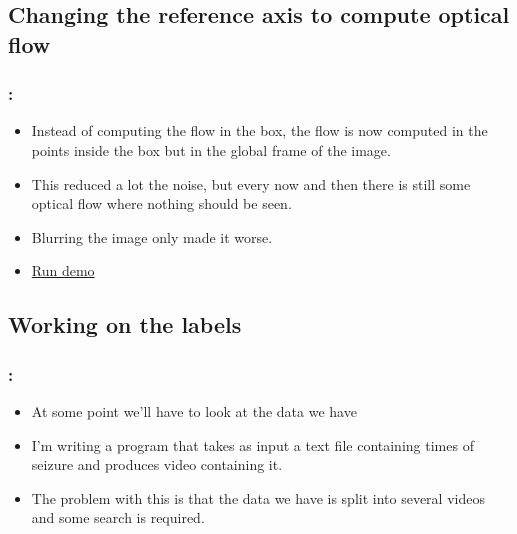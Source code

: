 \documentclass{beamer}
\begin{document}
\subsection{Changing the reference axis to compute optical flow}
\begin{frame}
  \frametitle{\secname : \subsecname}
  \begin{itemize}
      \item Instead of computing the flow in the box, the flow is now computed in the points inside the box but in the
        global frame of the image.
      \item This reduced a lot the noise, but every now and then there is still some optical flow where nothing should
        be seen.
      \item Blurring the image only made it worse.
      \item \href{run:runFlow.sh}{Run demo}
  \end{itemize}
\end{frame}


\subsection{Working on the labels}
\begin{frame}
  \frametitle{\secname : \subsecname}
  \begin{itemize}
      \item At some point we'll have to look at the data we have
      \item I'm writing a program that takes as input a text file containing times of seizure and produces video
        containing it.
      \item The problem with this is that the data we have is split into several videos and some search is required.
  \end{itemize}
\end{frame}
\end{document}
